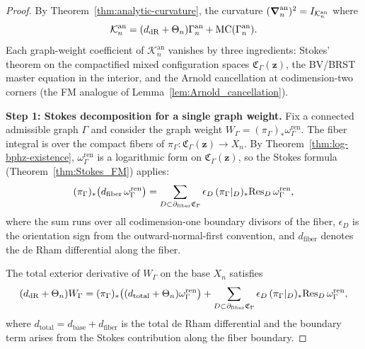 \begin{proof}
By Theorem~\ref{thm:analytic-curvature}, the curvature $(\boldsymbol{\nabla}_n^{\mathrm{an}})^2 = I_{\mathcal K_n^{\mathrm{an}}}$ where
\[
 \mathcal K_n^{\mathrm{an}} = (d_{\mathrm{dR}} + \Theta_n)\Gamma_n^{\mathrm{an}} + \mathrm{MC}(\Gamma_n^{\mathrm{an}}).
\]
Each graph-weight coefficient of $\mathcal K_n^{\mathrm{an}}$ vanishes by three ingredients: Stokes' theorem on the compactified mixed configuration spaces $\mathfrak C_\Gamma(\mathbf z)$, the BV/BRST master equation in the interior, and the Arnold cancellation at codimension-two corners (the FM analogue of Lemma~\ref{lem:Arnold_cancellation}).

\medskip
\textbf{Step 1: Stokes decomposition for a single graph weight.}
Fix a connected admissible graph $\Gamma$ and consider the graph weight $W_\Gamma = (\pi_\Gamma)_* \omega_\Gamma^{\mathrm{ren}}$. The fiber integral is over the compact fibers of $\pi_\Gamma : \mathfrak C_\Gamma(\mathbf z) \to X_n$. By Theorem~\ref{thm:log-bphz-existence}, $\omega_\Gamma^{\mathrm{ren}}$ is a logarithmic form on $\mathfrak C_\Gamma(\mathbf z)$, so the Stokes formula (Theorem~\ref{thm:Stokes_FM}) applies:
\[
 (\pi_\Gamma)_* \bigl(d_{\mathrm{fiber}}\, \omega_\Gamma^{\mathrm{ren}}\bigr)
 =
 \sum_{D \subset \partial_{\mathrm{fiber}} \mathfrak C_\Gamma} \epsilon_D\, (\pi_\Gamma|_D)_* \mathrm{Res}_D\, \omega_\Gamma^{\mathrm{ren}},
\]
where the sum runs over all codimension-one boundary divisors of the fiber, $\epsilon_D$ is the orientation sign from the outward-normal-first convention, and $d_{\mathrm{fiber}}$ denotes the de Rham differential along the fiber.

The total exterior derivative of $W_\Gamma$ on the base $X_n$ satisfies
\begin{equation}\label{eq:stokes-graph-weight}
 (d_{\mathrm{dR}} + \Theta_n) W_\Gamma
 =
 (\pi_\Gamma)_*\bigl((d_{\mathrm{total}} + \Theta_n)\omega_\Gamma^{\mathrm{ren}}\bigr)
 +
 \sum_{D \subset \partial_{\mathrm{fiber}} \mathfrak C_\Gamma} \epsilon_D\, (\pi_\Gamma|_D)_* \mathrm{Res}_D\, \omega_\Gamma^{\mathrm{ren}},
\end{equation}
where $d_{\mathrm{total}} = d_{\mathrm{base}} + d_{\mathrm{fiber}}$ is the total de Rham differential and the boundary term arises from the Stokes contribution along the fiber boundary.


\end{proof}
